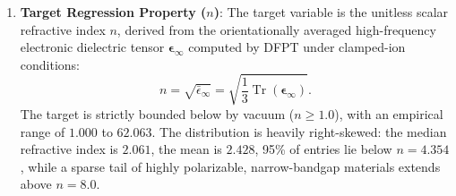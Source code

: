 \documentclass[final,3p,times]{elsarticle}
\begin{document}
\begin{enumerate}
    \item \textbf{Target Regression Property ($n$)}: The target variable is the unitless scalar refractive index $n$, derived from the orientationally averaged high-frequency electronic dielectric tensor $\boldsymbol{\epsilon}_{\infty}$ computed by DFPT under clamped-ion conditions:
    \begin{equation}
        n = \sqrt{\bar{\epsilon}_{\infty}} = \sqrt{\frac{1}{3}\operatorname{Tr}(\boldsymbol{\epsilon}_{\infty})}.
    \end{equation}
    The target is strictly bounded below by vacuum ($n \ge 1.0$), with an empirical range of $1.000$ to $62.063$. The distribution is heavily right-skewed: the median refractive index is $2.061$, the mean is $2.428$, 95\% of entries lie below $n = 4.354$, while a sparse tail of highly polarizable, narrow-bandgap materials extends above $n = 8.0$.
\end{enumerate}
\end{document}
